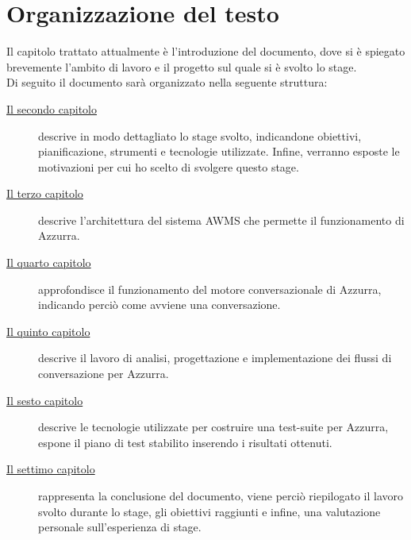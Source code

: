\section{Organizzazione del testo}
Il capitolo trattato attualmente è l'introduzione del documento, dove si è spiegato brevemente l'ambito di lavoro e il progetto sul quale si è svolto lo stage.\\
Di seguito il documento sarà organizzato nella seguente struttura:
\begin{description}
    
    \item[{\hyperref[cap:descrizione-stage]{Il secondo capitolo}}] descrive in modo dettagliato lo stage svolto, indicandone obiettivi, pianificazione, strumenti e tecnologie utilizzate. Infine, verranno esposte le motivazioni per cui ho scelto di svolgere questo stage.
    
    \item[{\hyperref[cap:archittettura del sistema AWMS]{Il terzo capitolo}}] descrive l'architettura del sistema \gls{AWMS}\ap{[g]} che permette il funzionamento di Azzurra.
    
    \item[{\hyperref[cap:flow engine]{Il quarto capitolo}}] approfondisce il funzionamento del motore conversazionale di Azzurra, indicando perciò come avviene una conversazione.
    
    \item[{\hyperref[cap:flussi di conversazione]{Il quinto capitolo}}] descrive il lavoro di analisi, progettazione e implementazione dei flussi di conversazione per Azzurra.
    
    \item[{\hyperref[cap:test]{Il sesto capitolo}}] descrive le tecnologie utilizzate per costruire una test-suite per Azzurra, espone il piano di test stabilito inserendo i risultati ottenuti.
    
    \item[{\hyperref[cap:conclusioni]{Il settimo capitolo}}] rappresenta la conclusione del documento, viene perciò riepilogato il lavoro svolto durante lo stage, gli obiettivi raggiunti e infine, una valutazione personale sull'esperienza di stage.
\end{description}

